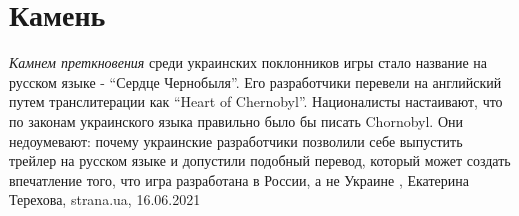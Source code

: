  
 
 
 
 
\chapter{Камень}

\emph{Камнем преткновения} среди украинских поклонников игры стало название на русском
языке - \enquote{Сердце Чернобыля}. Его разработчики перевели на английский путем
транслитерации как \enquote{Heart of Chernobyl}.  Националисты настаивают, что по
законам украинского языка правильно было бы писать Chornobyl. Они недоумевают:
почему украинские разработчики позволили себе выпустить трейлер на русском
языке и допустили подобный перевод, который может создать впечатление того, что
игра разработана в России, а не Украине
, 
Екатерина Терехова, strana.ua, 16.06.2021
